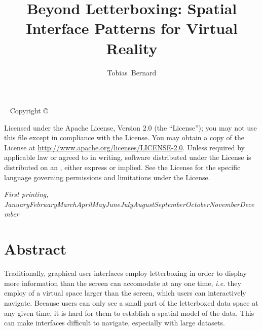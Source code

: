 \documentclass{tufte-book} %
\title{Beyond Letterboxing: Spatial Interface Patterns for Virtual Reality} %
\author[Tobias Bernard]{Tobias\ Bernard} %
\newcommand{\monthyear}{\ifcase\month\or January\or February\or March\or April\or May\or June\or July\or August\or September\or October\or November\or December\fi\space\number\year} %
\newcommand{\hairsp}{\hspace{1pt}} %
\newcommand{\ie}{\textit{i.\hairsp{}e.}\xspace} %
\begin{document}
\frontmatter



\maketitlepage %


\newpage
\begin{fullwidth}
~\vfill
\thispagestyle{empty}
\setlength{\parindent}{0pt}
\setlength{\parskip}{\baselineskip}
Copyright \copyright\ \the\year\ \thanklessauthor

\par{}

\par{}

\par Licensed under the Apache License, Version 2.0 (the ``License''); you may not use this file except in compliance with the License. You may obtain a copy of the License at \url{http://www.apache.org/licenses/LICENSE-2.0}. Unless required by applicable law or agreed to in writing, software distributed under the License is distributed on an , either express or implied. See the License for the specific language governing permissions and limitations under the License.

\par\textit{First printing, \monthyear}
\end{fullwidth}


\tableofcontents %


\mainmatter


\chapter{Abstract}

Traditionally, graphical user interfaces employ letterboxing in order to display more information than the screen can accomodate at any one time, \ie they employ of a virtual space larger than the screen, which users can interactively navigate. Because users can only see a small part of the letterboxed data space at any given time, it is hard for them to establish a spatial model of the data. This can make interfaces difficult to navigate, especially with large datasets.
\end{document}
